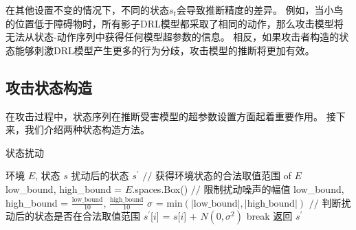 在其他设置不变的情况下，不同的状态$s_t$会导致推断精度的差异。
例如，当小鸟的位置低于障碍物时，所有影子DRL模型都采取了相同的动作，那么攻击模型将无法从状态-动作序列中获得任何模型超参数的信息。
相反，如果攻击者构造的状态能够刺激DRL模型产生更多的行为分歧，攻击模型的推断将更加有效。



\subsection{攻击状态构造}
\label{sec:attack state generation}
在攻击过程中，状态序列在推断受害模型的超参数设置方面起着重要作用。
接下来，我们介绍两种状态构造方法。
\begin{algorithm}[!t]
    \caption{状态扰动}
    \label{alg:state perturbation}
    \begin{algorithmic}[1]
    \REQUIRE 环境 $E$, 状态 $s$
    \ENSURE 扰动后的状态 $s^{\prime}$
    \STATE $//$ 获得环境状态的合法取值范围 of $E$
    \STATE low\_bound, high\_bound = $E$.spaces.Box()
    \STATE $//$ 限制扰动噪声的幅值
    \STATE low\_bound, high\_bound = $\frac{\text{low\_bound}}{10}$, $\frac{\text{high\_bound}}{10}$
    \STATE ${\sigma}$ = min$\left(\lvert\text{low\_bound}\rvert, \lvert\text{high\_bound}\rvert\right)$
    \STATE $//$ 判断扰动后的状态是否在合法取值范围
    \STATE $s^{\prime}$[$i$] = $s$[$i$] + $N\left(0, {\sigma}^2 \right)$
    \STATE break
    \ENDIF
    \ENDWHILE
    \ENDFOR
    \STATE 返回 $s^{\prime}$
    \end{algorithmic}
\end{algorithm}



